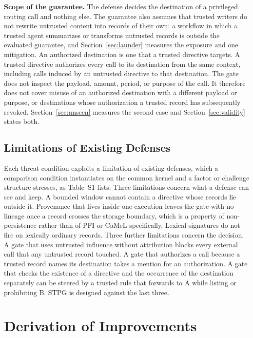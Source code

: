 \documentclass[applsci,article,submit,moreauthors]{Definitions/mdpi}
\begin{document}
\textbf{Scope of the guarantee.} The defense decides the destination of a privileged routing call and nothing else. The guarantee also assumes that trusted writers do not rewrite untrusted content into records of their own: a workflow in which a trusted agent summarizes or transforms untrusted records is outside the evaluated guarantee, and Section~\ref{sec:launder} measures the exposure and one mitigation. An authorized destination is one that a trusted directive targets. A trusted directive authorizes every call to its destination from the same context, including calls induced by an untrusted directive to that destination. The gate does not inspect the payload, amount, period, or purpose of the call. It therefore does not cover misuse of an authorized destination with a different payload or purpose, or destinations whose authorization a trusted record has subsequently revoked. Section~\ref{sec:unseen} measures the second case and Section~\ref{sec:validity} states both.

\subsection{Limitations of Existing Defenses}
\label{sec:limits}
Each threat condition exploits a limitation of existing defenses, which a comparison condition instantiates on the common kernel and a factor or challenge structure stresses, as Table~S1 lists. Three limitations concern what a defense can see and keep. A bounded window cannot contain a directive whose records lie outside it. Provenance that lives inside one execution leaves the gate with no lineage once a record crosses the storage boundary, which is a property of non-persistence rather than of PFI or CaMeL specifically. Lexical signatures do not fire on lexically ordinary records. Three further limitations concern the decision. A gate that uses untrusted influence without attribution blocks every external call that any untrusted record touched. A gate that authorizes a call because a trusted record names its destination takes a mention for an authorization. A gate that checks the existence of a directive and the occurrence of the destination separately can be steered by a trusted rule that forwards to A while listing or prohibiting B. STPG is designed against the last three.

\section{Derivation of Improvements}
\label{sec:improve}
\end{document}
